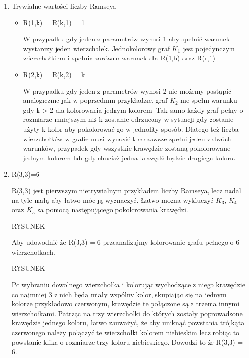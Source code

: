 \documentclass[11pt]{article}
\begin{document}
\begin{enumerate}
  \item Trywialne wartości liczby Ramseya \hfill 
  
  \begin{itemize}
  \item R(1,k) = R(k,1) = 1 \hfill \par
  W przypadku gdy jeden z parametrów wynosi 1 aby spełnić warunek wystarczy jeden wierzchołek.  Jednokolorowy graf $\mathit{K}_{1}$ jest pojedynczym wierzchołkiem i spełnia zarówno warunek dla R(1,b) oraz R(r,1). 
  
   \item R(2,k) = R(k,2) = k \hfill  \par
	W przypadku gdy jeden z parametrów wynosi 2 nie możemy postąpić analogicznie jak w poprzednim przykładzie, graf $\mathit{K}_{2}$ nie spełni warunku gdy k > 2 dla kolorowania jednym kolorem. Tak samo każdy graf pełny o rozmiarze mniejszym niż k zostanie odrzucony w sytuacji gdy zostanie użyty k kolor aby pokolorować go w jednolity sposób. Dlatego też liczba wierzchołków w grafie musi wynosić k co zawsze spełni jeden z dwóch warunków, przypadek gdy wszystkie krawędzie zostaną pokolorowane jednym kolorem lub gdy chociaż jedna krawędź będzie drugiego koloru.
  	
  \end{itemize}

  
 
  \item R(3,3)=6 \hfill \par
  R(3,3) jest pierwszym nietrywialnym przykładem liczby Ramseya, lecz nadal na tyle małą aby łatwo móc ją wyznaczyć. Łatwo można wykluczyć $\mathit{K}_{3}$, $\mathit{K}_{4}$ oraz $\mathit{K}_{5}$ za pomocą następującego pokolorowania krawędzi.


RYSUNEK

  
Aby udowodnić że R(3,3) = 6 przeanalizujmy kolorowanie grafu pełnego o 6 wierzchołkach. 


RYSUNEK


Po wybraniu dowolnego wierzchołka i kolorując wychodzące z niego krawędzie co najmniej 3 z nich będą miały wspólny kolor, skupiając się na jednym kolorze przykładowo czerwonym, krawędzie te połączone są z trzema innymi wierzchołkami. Patrząc na trzy wierzchołki do których zostały poprowadzone krawędzie jednego koloru, łatwo zauważyć, że aby uniknąć powstania trójkąta czerwonego należy połączyć te wierzchołki kolorem niebieskim lecz robiąc to powstanie klika o rozmiarze trzy koloru niebieskiego. Dowodzi to że R(3,3) = 6.
    




\end{enumerate}
\end{document}
